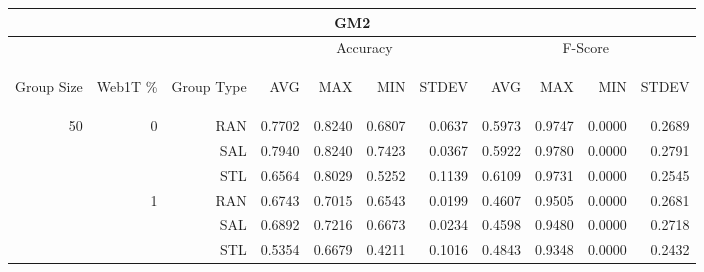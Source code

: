 \begin{center}
\begin{table}[htbp]
\begin{tabular}{ | r | r | r | r | r | r | r | r | r | r | r |}
\hline
\multicolumn{11}{|c|}{GM2}\\
\hline
 & & & \multicolumn{4}{|c|}{Accuracy} & \multicolumn{4}{|c|}{F-Score}\\ \cline{4-11}
\begin{sideways}Group Size\end{sideways} & \begin{sideways}Web1T \%\end{sideways} & \begin{sideways}Group Type\end{sideways} & \begin{sideways}AVG\end{sideways} & \begin{sideways}MAX\end{sideways} & \begin{sideways}MIN\end{sideways} & \begin{sideways}STDEV\end{sideways} & \begin{sideways}AVG\end{sideways} & \begin{sideways}MAX\end{sideways} & \begin{sideways}MIN\end{sideways} & \begin{sideways}STDEV\end{sideways}\\
\hline
\multirow{15}{*}{50}
 & \multirow{3}{*}{0} & RAN & 0.7702 & 0.8240 & 0.6807 & 0.0637 & 0.5973 & 0.9747 & 0.0000 & 0.2689\\ \cline{3-11}
 &   & SAL & 0.7940 & 0.8240 & 0.7423 & 0.0367 & 0.5922 & 0.9780 & 0.0000 & 0.2791\\ \cline{3-11}
 &   & STL & 0.6564 & 0.8029 & 0.5252 & 0.1139 & 0.6109 & 0.9731 & 0.0000 & 0.2545\\ \cline{2-11}
 & \multirow{3}{*}{1} & RAN & 0.6743 & 0.7015 & 0.6543 & 0.0199 & 0.4607 & 0.9505 & 0.0000 & 0.2681\\ \cline{3-11}
 &   & SAL & 0.6892 & 0.7216 & 0.6673 & 0.0234 & 0.4598 & 0.9480 & 0.0000 & 0.2718\\ \cline{3-11}
 &   & STL & 0.5354 & 0.6679 & 0.4211 & 0.1016 & 0.4843 & 0.9348 & 0.0000 & 0.2432\\ \cline{2-11}

\end{tabular}
\end{table}
\end{center}
